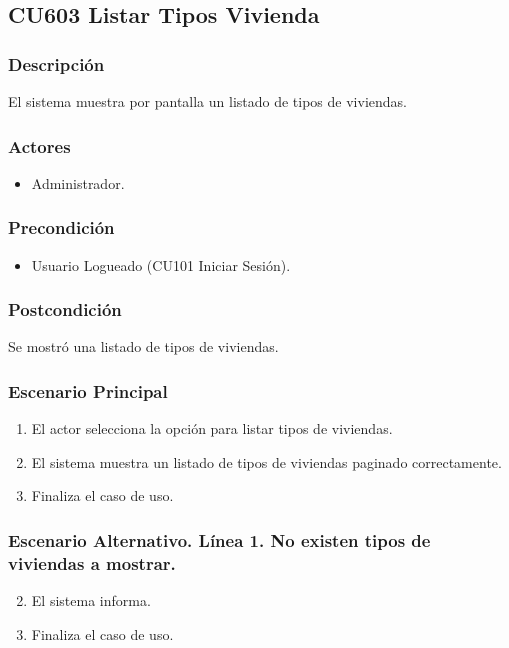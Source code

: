 \subsection{CU603 Listar Tipos Vivienda}
\subsubsection{Descripci\'{o}n}
El sistema muestra por pantalla un listado de tipos de viviendas.
\subsubsection{Actores}
\begin{itemize}
\item Administrador.
\end{itemize}
\subsubsection{Precondici\'{o}n}
\begin{itemize}
\item Usuario Logueado (CU101 Iniciar Sesi\'{o}n).
\end{itemize}
\subsubsection{Postcondici\'{o}n}
Se mostr\'{o} una listado de tipos de viviendas.
\subsubsection{Escenario Principal}
\begin{enumerate}
\item El actor selecciona la opci\'{o}n para listar tipos de viviendas.
\item El sistema muestra un listado de tipos de viviendas paginado correctamente.
\item Finaliza el caso de uso.
\end{enumerate}
\subsubsection{Escenario Alternativo. L\'{i}nea 1. No existen tipos de viviendas a mostrar.}
\begin{enumerate}
\setcounter{enumi}{1}
\item El sistema informa.
\item Finaliza el caso de uso.
\end{enumerate}